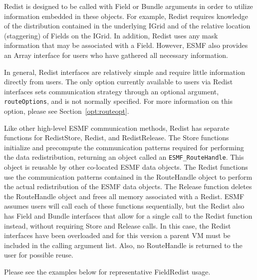 Redist is designed to be called with Field or Bundle arguments in order to
utilize information embedded in these objects.  For example, Redist requires
knowledge of the distribution contained in the underlying IGrid and of the
relative location (staggering) of Fields on the IGrid.  In addition, Redist uses
any mask information that may be associated with a Field.  However, ESMF also
provides an Array interface for users who have gathered all necessary
information.

In general, Redist interfaces are relatively simple and require little
information directly from users.  The only option currently available to users
via Redist interfaces sets communication strategy through an optional argument,
{\tt routeOptions}, and is not normally specified.  For more information on
this option, please see Section~\ref{opt:routeopt}.

Like other high-level ESMF communication methods, Redist has separate
functions for RedistStore, Redist, and RedistRelease.  The Store functions
initialize and precompute the communication patterns required for performing
the data redistribution, returning an object called an {\tt ESMF\_RouteHandle}.
This object is reusable by other co-located ESMF data objects.
The Redist functions use the communication patterns contained in the RouteHandle
object to perform the actual redistribution of the ESMF data objects.  The
Release function deletes the RouteHandle object and frees all memory associated
with a Redist.  ESMF assumes users will call each of these functions
sequentially, but the Redist also has Field and Bundle interfaces that allow for
a single call to the Redist function instead, without requiring Store and
Release calls.  In this case, the Redist interfaces have been overloaded and
for this version a parent VM must be included in the calling argument list.
Also, no RouteHandle is returned to the user for possible reuse.

Please see the examples below for representative FieldRedist usage.



